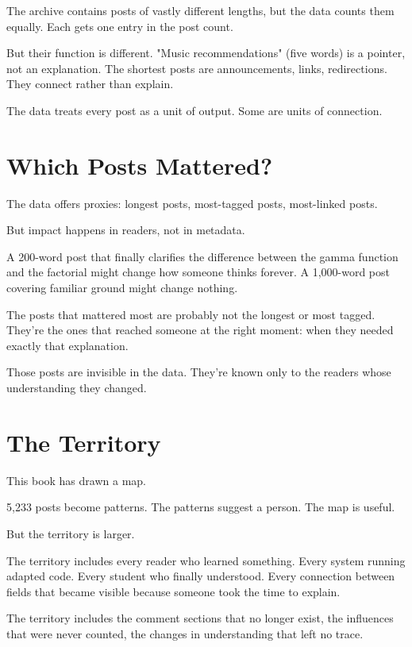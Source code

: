 The archive contains posts of vastly different lengths, but the data counts them equally. Each gets one entry in the post count.

But their function is different. "Music recommendations" (five words) is a pointer, not an explanation. The shortest posts are announcements, links, redirections. They connect rather than explain.

The data treats every post as a unit of output. Some are units of connection.

\bigskip

\section*{Which Posts Mattered?}

The data offers proxies: longest posts, most-tagged posts, most-linked posts.

But impact happens in readers, not in metadata.

A 200-word post that finally clarifies the difference between the gamma function and the factorial might change how someone thinks forever. A 1,000-word post covering familiar ground might change nothing.

The posts that mattered most are probably not the longest or most tagged. They're the ones that reached someone at the right moment: when they needed exactly that explanation.

Those posts are invisible in the data. They're known only to the readers whose understanding they changed.

\bigskip

\section*{The Territory}

This book has drawn a map.

5,233 posts become patterns. The patterns suggest a person. The map is useful.

But the territory is larger.

The territory includes every reader who learned something. Every system running adapted code. Every student who finally understood. Every connection between fields that became visible because someone took the time to explain.

The territory includes the comment sections that no longer exist, the influences that were never counted, the changes in understanding that left no trace.

